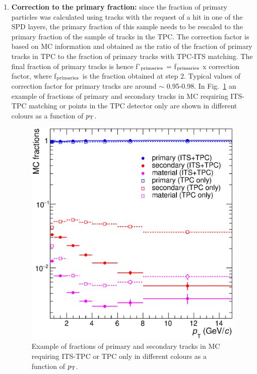 \begin{enumerate}
\item {\bf Correction to the primary fraction:} since the fraction of primary
 particles was calculated using tracks with the request of a hit in one of the SPD layers, 
the primary fraction of this sample 
needs to be rescaled to the primary fraction of the sample of tracks in the TPC. 
The correction factor is based on MC information and obtained as 
the ratio of the fraction of primary tracks in TPC to the fraction of primary
 tracks with TPC-ITS matching. The final fraction of primary tracks is hence
  f'$_{\rm primaries}$ = f$_{\rm primaries}$ x correction factor, 
  where f$_{\rm primaries}$ is the fraction obtained at step 2. 
  Typical values of correction factor for primary tracks are around $\sim$ 0.95-0.98. 
  In Fig.~\ref{fig:MCfractions} an example of fractions of primary 
  and secondary tracks in MC requiring ITS-TPC matching or points in the TPC detector only are 
  shown in different colours as a function of $p_{\rm T}$.
\begin{figure}[!htb]
\begin{center}
\includegraphics[width=.50\textwidth]{FigCap4/MCfractions_ESDTrOnly_VsPt_PiK.eps}
\caption{Example of fractions of primary and secondary tracks in MC requiring ITS-TPC or TPC only in different colours as a function of $p_{\rm T}$.}
\label{fig:MCfractions}
\end{center}
\end{figure}


\end{enumerate}
